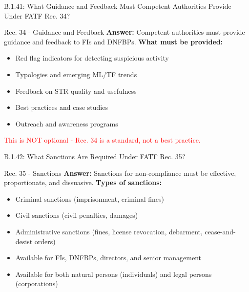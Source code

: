 \documentclass{beamer}
\begin{document}
	\begin{frame}{B.1.41: What Guidance and Feedback Must Competent Authorities Provide Under FATF Rec. 34?}
		\begin{block}{Rec. 34 - Guidance and Feedback}
			\textbf{Answer:} Competent authorities must provide guidance and feedback to FIs and DNFBPs.
			\vspace{0.2cm}
			\textbf{What must be provided:}
			\begin{itemize}
				\item Red flag indicators for detecting suspicious activity
				\item Typologies and emerging ML/TF trends
				\item Feedback on STR quality and usefulness
				\item Best practices and case studies
				\item Outreach and awareness programs
			\end{itemize}
			\textcolor{red}{This is NOT optional - Rec. 34 is a standard, not a best practice.}
		\end{block}
	\end{frame}
	
	\begin{frame}{B.1.42: What Sanctions Are Required Under FATF Rec. 35?}
		\begin{block}{Rec. 35 - Sanctions}
			\textbf{Answer:} Sanctions for non-compliance must be effective, proportionate, and dissuasive.
			\vspace{0.2cm}
			\textbf{Types of sanctions:}
			\begin{itemize}
				\item Criminal sanctions (imprisonment, criminal fines)
				\item Civil sanctions (civil penalties, damages)
				\item Administrative sanctions (fines, license revocation, debarment, cease-and-desist orders)
				\item Available for FIs, DNFBPs, directors, and senior management
				\item Available for both natural persons (individuals) and legal persons (corporations)
			\end{itemize}
		\end{block}
	\end{frame}
	
\end{document}
